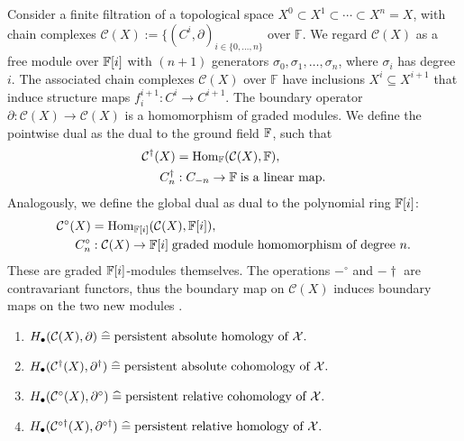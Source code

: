 Consider a finite filtration of a topological space $X^0 \subset X^1 \subset \cdots \subset X^n = X$, with chain complexes \( \mathcal{C}(X) := \{(C^i, \partial)_{i \in \{0, \ldots, n\}}\) over \( \mathbb{F} \). We regard $\mathcal{C}(X)$ as a free module over ${\mathbb{F}}[i]$ with $(n+1)$ generators $\sigma_0, \sigma_1, \ldots, \sigma_n$, where $\sigma_i$ has degree $i$. The associated chain complexes \( \mathcal{C}(X) \) over \( \mathbb{F} \) have inclusions \( X^i \subseteq X^{i+1} \) that induce structure maps \( f_{i}^{i+1}: C^i \to C^{i+1} \). The boundary operator $\partial: \mathcal{C}(X) \rightarrow \mathcal{C}(X)$ is a homomorphism of graded modules. We define the pointwise dual as the dual to the ground field ${\mathbb{F}}$, such that
\begin{align}
\mathcal{C}^\dagger(X) &= {\mathrm{Hom}}_{\mathbb{F}}(\mathcal{C}(X),{\mathbb{F}}), \\
C^{\dagger}_n&: C_{-n} \rightarrow {\mathbb{F}} \; \text{is a linear map.}
\end{align}
Analogously, we define the global dual as dual to the polynomial ring ${\mathbb{F}}[i]$:
\begin{align}
\mathcal{C}^\circ(X) &= {\mathrm{Hom}}_{{\mathbb{F}}[i]}(\mathcal{C}(X),{\mathbb{F}}[i]), \\
C^{\circ}_n&: \mathcal{C}(X) \rightarrow {\mathbb{F}}[i] \; \text{graded module homomorphism of degree $n$.}
\end{align}
These are graded ${\mathbb{F}}[i]$-modules themselves. The operations $-^\circ$ and $-\dagger$ are contravariant functors, thus the boundary map on $\mathcal{C}(X)$ induces boundary maps on the two new modules \cite[\S 2.8]{de2011dualities}.

\begin{theorem}\noindent
\begin{enumerate}
\item \(H_\bullet(\mathcal{C}(X), \partial) \; \widehat{=} \; \text{persistent absolute homology\index{homology} of } \mathcal{X}.\)
\item \(H_\bullet(\mathcal{C}^\dagger(X), \partial^\dagger) \; \widehat{=} \; \text{persistent absolute cohomology\index{cohomology} of } \mathcal{X}.\)
\item \(H_\bullet(\mathcal{C}^\circ(X), \partial^\circ) \; \widehat{=} \; \text{persistent relative cohomology\index{cohomology} of } \mathcal{X}.\)
\item \(H_\bullet(\mathcal{C}^{\circ\dagger}(X), \partial^{\circ\dagger}) \; \widehat{=} \; \text{persistent relative homology\index{homology} of } \mathcal{X}.\)
\end{enumerate}
\end{theorem}

